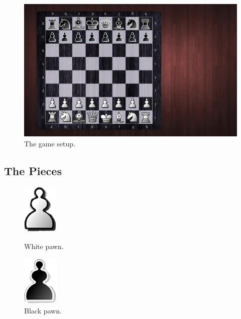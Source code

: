 \documentclass[12pt, a4paper]{article}
\begin{document}
\begin{figure}[h!]
\centering
\includegraphics[width=0.9\linewidth]{figures/boardwithpieces.jpg}
\caption{The game setup.}
\end{figure}

\vfill
\clearpage

\newpage
\vfill
\subsection{The Pieces}

\begin{figure}[h!]
\centering
\begin{minipage}{.5\textwidth}
  \centering
  \includegraphics[width=.4\linewidth]{figures/whitepawn.png}
  \caption{White pawn.}
\end{minipage}%
\begin{minipage}{.5\textwidth}
  \centering
  \includegraphics[width=.4\linewidth]{figures/blackpawn.png}
  \caption{Black pawn.}
\end{minipage}
\end{figure}
\end{document}

